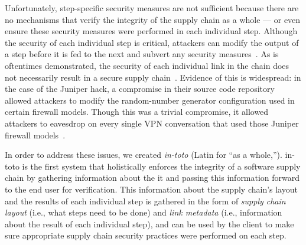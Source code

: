 Unfortunately, step-specific security measures are not sufficient because there
are no mechanisms that verify the integrity of the supply chain as a whole ---
or even ensure these security measures were performed in each individual
step. Although the security of each individual step is critical, attackers can
modify the output of a step before it is fed to the next and subvert any
security measures~\cite{juniper-backdoor, aurora-scm, linux-backdoor-2003}. As is oftentimes
demonstrated, the security of each individual link in the chain does not
necessarily result in a secure supply chain~\cite{redhat-hacked,
linux-mint-hack, xcode}. Evidence of this is widespread: in the case of the Juniper hack, a compromise in their source
code repository allowed attackers to modify the random-number
generator configuration used in certain firewall models. Though this was a trivial compromise, it allowed
attackers to eavesdrop on every single VPN conversation that used those Juniper
firewall models~\cite{juniper-backdoor}.

In order to address these issues, we created {\it in-toto} (Latin for ``as a
whole,''). in-toto is the first system that holistically enforces the integrity
of a software supply chain by gathering information about the it and
passing this information forward to the end user for verification. This
information about the supply chain's layout and the results of each individual
step is gathered in the form of {\it supply chain layout} (i.e., what steps
need to be done) and {\it link metadata} (i.e., information about the result of
each individual step), and can be used by the client to make sure appropriate
supply chain security practices were performed on each step.
